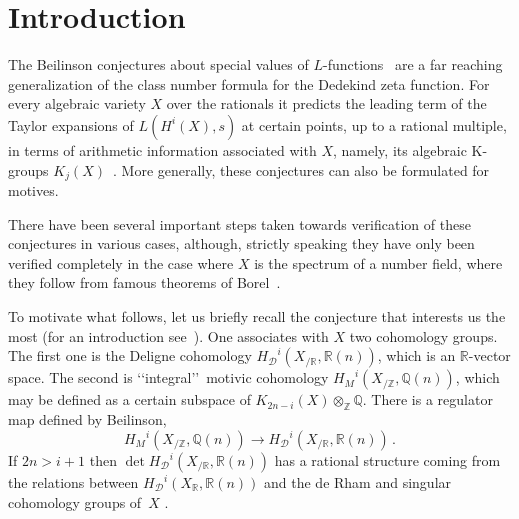 \documentclass{amsart}
\begin{document}


\maketitle


\section{Introduction}

The Beilinson conjectures about special values of {$L$-functions{\futurelet{}}}~\cite{bei85}
are a far reaching generalization of the class number formula for the
Dedekind zeta function. For every algebraic variety $X$ over the
rationals it predicts the leading term of the Taylor expansions of $L(H^i(X),s)$
at certain points, up to a
rational multiple, in terms of
arithmetic information associated with $X$, namely, its algebraic
K-groups $K_j(X)$~\cite{qui73b}. More generally, these conjectures can also be formulated for motives.

There have been several important steps taken towards verification of
these conjectures in various cases, although, strictly speaking they
have only been verified completely in the case where $X$ is the
spectrum of a number field, where they follow from famous theorems 
of Borel~\cite{Borel74, Borel77}.

To motivate what follows, let us briefly recall the conjecture that
interests us the most (for an introduction see~\cite{DenSch91,schn88}).
One associates with $X$ two cohomology 
groups. The first one is the Deligne cohomology ${H_{\mathcal D}}^i(X_{/{\mathbb R}},{\mathbb R}(n)) $, which is an
${\mathbb R}$-vector space. The second is \lq\lq integral\rq\rq\ motivic cohomology ${H_M}^i(X_{/{\mathbb Z}},{\mathbb Q}(n)) $,
which may be defined as a certain subspace of $K_{2n-i}(X){\otimes}_{\mathbb Z} {\mathbb Q}$.
There is a regulator map defined by Beilinson,
\begin{equation}\label{regmap}
 {H_M}^i(X_{/{\mathbb Z}},{\mathbb Q}(n)) \to {H_{\mathcal D}}^i(X_{/{\mathbb R}},{\mathbb R}(n))
\,.
\end{equation}
If $ 2n > i+1 $ then  $\det{H_{\mathcal D}}^i(X_{/{\mathbb R}},{\mathbb R}(n))$ has a rational structure
coming from the relations between $ {H_{\mathcal D}}^i(X_{\mathbb R},{\mathbb R}(n)) $ and the de Rham and singular cohomology groups of~$X$
\cite[p.30]{schn88}.
\end{document}
